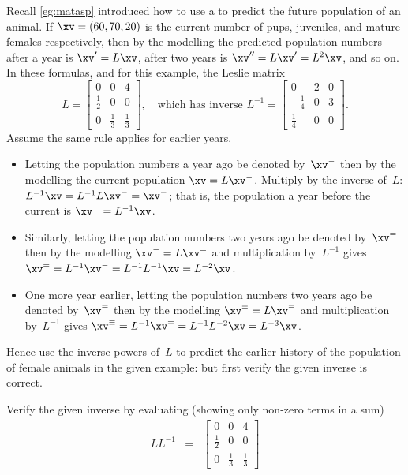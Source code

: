 \begin{example} \label{eg:invph}
Recall \autoref{eg:matasp} introduced how to use a  to predict the future population of an animal.
If \(\xv=(60,70,20)\) is the current number of pups, juveniles, and mature females respectively, then by the modelling the predicted population numbers after a year is \(\xv'=L\xv\), after two years is \(\xv''=L\xv'=L^2\xv\), and so on.
In these formulas, and for this example, the Leslie matrix
\begin{equation*}
L=\begin{bmatrix} 0&0&4\\\frac12&0&0\\0&\frac13&\frac13 \end{bmatrix},
\quad\text{which has inverse }L^{-1}=\begin{bmatrix} 0&2&0\\-\frac14&0&3\\\frac14&0&0 \end{bmatrix}.
\end{equation*} 
Assume the same rule applies for earlier years.
\begin{itemize}
\item Letting the population numbers a year ago be denoted by~\(\xv^-\) then by the modelling the current population \(\xv=L\xv^-\).
Multiply by the inverse of~\(L\): \(L^{-1}\xv=L^{-1}L\xv^-=\xv^-\); that is, the population a year before the current is \(\xv^-=L^{-1}\xv\).
\item Similarly, letting the population numbers two years ago be denoted by~\(\xv^=\) then  by the modelling \(\xv^-=L\xv^=\) and multiplication by~\(L^{-1}\) gives \(\xv^==L^{-1}\xv^-=L^{-1}L^{-1}\xv=L^{-2}\xv\).
\item One more year earlier, letting the population numbers two years ago be denoted by~\(\xv^\equiv\) then  by the modelling \(\xv^==L\xv^\equiv\) and multiplication by~\(L^{-1}\) gives \(\xv^\equiv=L^{-1}\xv^==L^{-1}L^{-2}\xv=L^{-3}\xv\).
\end{itemize}
Hence use the inverse powers of~\(L\) to predict the earlier history of the population of female animals in the given example: but first verify the given inverse is correct.
\begin{solution} 
Verify the given inverse by evaluating (showing only non-zero terms in a sum)
\begin{eqnarray*}
LL^{-1}&=&
\begin{bmatrix} 0&0&4\\\frac12&0&0\\0&\frac13&\frac13 \end{bmatrix}

\end{eqnarray*}
\end{solution}
\end{example}

